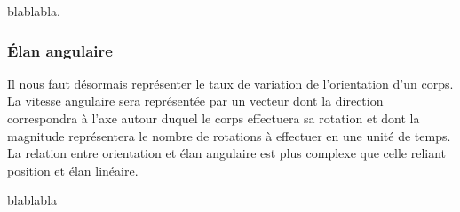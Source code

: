 blablabla.

\subsubsection{\'Elan angulaire}

Il nous faut désormais représenter le taux de variation de l'orientation d'un corps. La vitesse angulaire sera représentée par un vecteur dont la direction correspondra à l'axe autour duquel le corps effectuera sa rotation et dont la magnitude représentera le nombre de rotations à effectuer en une unité de temps. La relation entre orientation et élan angulaire est plus complexe que celle reliant position et élan linéaire.

blablabla

